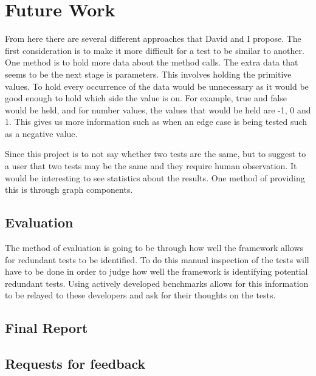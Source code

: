 \chapter{Future Work}\label{C:future}

From here there are several different approaches that David and I propose. The first consideration is to make it more difficult for a test to be similar to another. One method is to hold more data about the method calls. The extra data that seems to be the next stage is parameters. This involves holding the primitive values. To hold every occurrence of the data would be unnecessary as it would be good enough to hold which side the value is on. For example, true and false would be held, and for number values, the values that would be held are -1, 0 and 1. This gives us more information such as when an edge case is being tested such as a negative value.

Since this project is to not say whether two tests are the same, but to suggest to a user that two tests may be the same and they require human observation. It would be interesting to see statistics about the results. One method of providing this is through graph components. 

\section{Evaluation}
The method of evaluation is going to be through how well the framework allows for redundant tests to be identified. To do this manual inspection of the tests will have to be done in order to judge how well the framework is identifying potential redundant tests. Using actively developed benchmarks allows for this information to be relayed to these developers and ask for their thoughts on the tests.

\section{Final Report}

\section{Requests for feedback}
